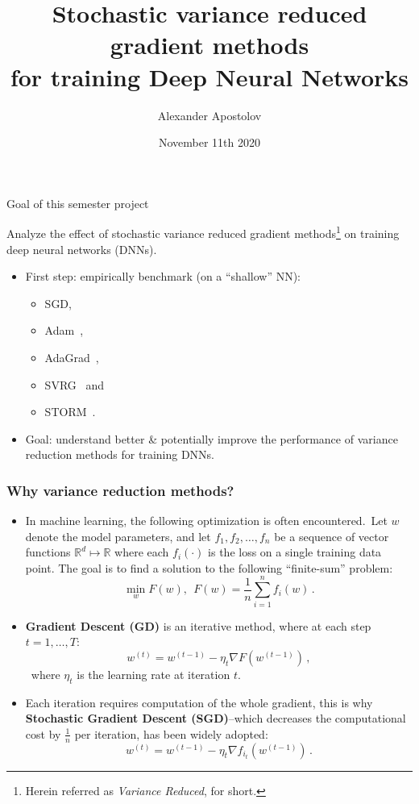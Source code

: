 \documentclass[10pt]{beamer}
\title{Stochastic variance reduced gradient methods \\for training Deep Neural Networks}
\author{Alexander Apostolov}
\institute {École Polytechnique Fédérale de Lausanne}
\date{November 11th 2020}
\begin{document}
\frame{\titlepage}


\begin{frame}{Goal of this semester project}

Analyze the effect of \alert{stochastic variance reduced gradient methods}\footnote{Herein referred as \textit{Variance Reduced},  for short. } on  training \alert{deep neural networks} (DNNs).
\newline
\begin{itemize}
    \item First step: empirically benchmark (on a ``shallow'' NN):
    \begin{itemize}
        \item SGD, 
        \item Adam~\citep{kingma2014adam}, 
        \item AdaGrad~\citep{john2011adagrad}, 
        \item SVRG~\citep{johnson2013accelerating} and 
        \item STORM~\citep{Cutkosky2019storm}.
    \end{itemize}
    \item Goal: understand better \& potentially improve the performance of variance reduction methods for training DNNs. 
\end{itemize}
    
\end{frame}

\begin{frame}
\frametitle{Why variance reduction methods?}
\begin{itemize}
    \item In machine learning, the following optimization is often encountered.\
    Let $w$ denote the model parameters, and let $f_1, f_2, \dots, f_n$ be a sequence of vector functions $\mathbb{R}^d \mapsto \mathbb{R}$ where each $f_i(\cdot)$ is the loss on a single training data point.
    The goal is to find a solution to the following ``finite-sum'' problem:
    $$\min_w F(w),~~F(w)=\frac{1}{n}\sum_{i=1}^n f_i(w)\,.$$
    \item \textbf{Gradient Descent (GD)} is an iterative method, where at each step $ t=1, \dots, T$:
    $$w^{(t)} = w^{(t-1)} - \eta_t \nabla F(w^{(t-1)}) \,,$$\
    where $\eta_t$ is the learning rate at iteration $t$.
    \item Each iteration requires computation of the whole gradient, this is why \textbf{Stochastic Gradient Descent (SGD)}--which decreases  the computational cost by $\frac{1}{n}$ per iteration, has been widely adopted:
    $$w^{(t)} = w^{(t-1)} -\eta_t \nabla f_{i_t}(w^{(t-1)})\,.$$
\end{itemize}
\end{frame}
\end{document}
